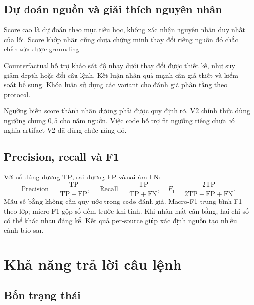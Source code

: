 \subsection{Dự đoán nguồn và giải thích nguyên nhân}

Score cao là dự đoán theo mục tiêu học, không xác nhận nguyên nhân duy nhất của lỗi. Score khớp nhãn cũng chưa chứng minh thay đổi riêng nguồn đó chắc chắn sửa được grounding.

Counterfactual hỗ trợ khảo sát độ nhạy dưới thay đổi được thiết kế, như suy giảm depth hoặc đổi câu lệnh. Kết luận nhân quả mạnh cần giả thiết và kiểm soát bổ sung. Khóa luận sử dụng các variant cho đánh giá phân tầng theo protocol.

Ngưỡng biến score thành nhãn dương phải được quy định rõ. V2 chính thức dùng ngưỡng chung $0{,}5$ cho năm nguồn. Việc code hỗ trợ fit ngưỡng riêng chưa có nghĩa artifact V2 đã dùng chức năng đó.

\subsection{Precision, recall và F1}

Với số đúng dương $\mathrm{TP}$, sai dương $\mathrm{FP}$ và sai âm $\mathrm{FN}$:
\begin{equation}
    \operatorname{Precision}=\frac{\mathrm{TP}}{\mathrm{TP}+\mathrm{FP}},
    \quad \operatorname{Recall}=\frac{\mathrm{TP}}{\mathrm{TP}+\mathrm{FN}},
    \quad F_1=\frac{2\mathrm{TP}}{2\mathrm{TP}+\mathrm{FP}+\mathrm{FN}}.
    \label{eq:theory-f1}
\end{equation}
Mẫu số bằng không cần quy ước trong code đánh giá. Macro-F1 trung bình F1 theo lớp; micro-F1 gộp số đếm trước khi tính. Khi nhãn mất cân bằng, hai chỉ số có thể khác nhau đáng kể. Kết quả per-source giúp xác định nguồn tạo nhiều cảnh báo sai.

\section{Khả năng trả lời câu lệnh}
\label{sec:theory-answerability}

\subsection{Bốn trạng thái}

